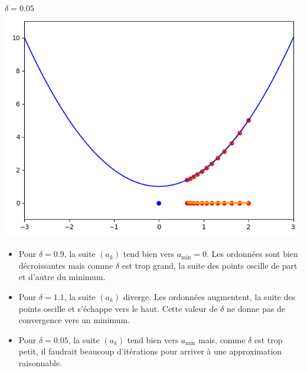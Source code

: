 \documentclass[11pt,class=report,crop=false]{standalone}
\begin{document}
\begin{exemple}
\begin{center}
\begin{minipage}{0.32\textwidth}
\begin{center}
\end{center}
\end{minipage}
\begin{minipage}{0.32\textwidth}
\begin{center}
$\delta=0.05$
\includegraphics[scale=\myscale,scale=0.3]{figures/descente_une_var_05}
\end{center}
\end{minipage}
\end{center}

\begin{itemize}
  \item Pour $\delta = 0.9$, la suite $(a_k)$ tend bien vers $a_{\min} = 0$. Les ordonnées sont bien décroissantes mais comme $\delta$ est trop grand, la suite des points oscille de part et d'autre du minimum.
  
  \item Pour $\delta = 1.1$, la suite $(a_k)$ diverge. Les ordonnées augmentent, la suite des points oscille et s'échappe vers le haut. Cette valeur de $\delta$ ne donne pas de convergence vers un minimum.
  
  \item Pour $\delta = 0.05$, la suite $(a_k)$ tend bien vers $a_{\min}$ mais, comme $\delta$ est trop petit, il faudrait beaucoup d'itérations pour arriver à une approximation raisonnable.
  
\end{itemize}
\end{exemple}
\end{document}

